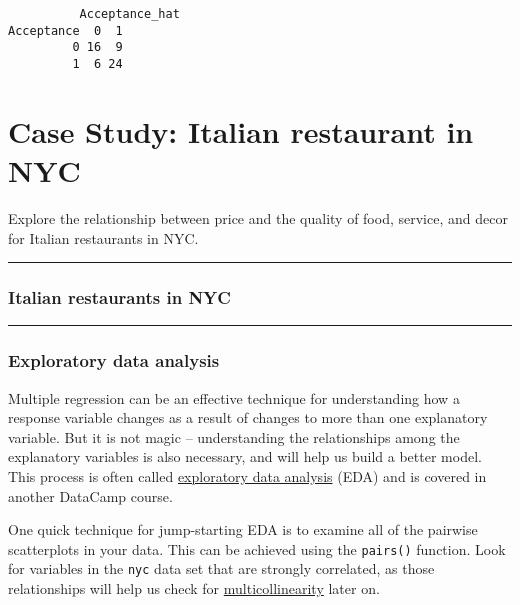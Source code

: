 \documentclass[
]{book}
\begin{document}
\begin{verbatim}
          Acceptance_hat
Acceptance  0  1
         0 16  9
         1  6 24
\end{verbatim}

\hypertarget{case-study-italian-restaurant-in-nyc}{%
\chapter{Case Study: Italian restaurant in NYC}\label{case-study-italian-restaurant-in-nyc}}

Explore the relationship between price and the quality of food, service, and decor for Italian restaurants in NYC.

\begin{center}\rule{0.5\linewidth}{0.5pt}\end{center}

\hypertarget{italian-restaurants-in-nyc}{%
\subsection*{Italian restaurants in NYC}\label{italian-restaurants-in-nyc}}

\begin{center}\rule{0.5\linewidth}{0.5pt}\end{center}

\hypertarget{exploratory-data-analysis}{%
\subsection*{Exploratory data analysis}\label{exploratory-data-analysis}}

Multiple regression can be an effective technique for understanding how a response variable changes as a result of changes to more than one explanatory variable. But it is not magic -- understanding the relationships among the explanatory variables is also necessary, and will help us build a better model. This process is often called \href{https://en.wikipedia.org/wiki/Exploratory_data_analysis}{exploratory data analysis} (EDA) and is covered in another DataCamp course.

One quick technique for jump-starting EDA is to examine all of the pairwise scatterplots in your data. This can be achieved using the \texttt{pairs()} function. Look for variables in the \texttt{nyc} data set that are strongly correlated, as those relationships will help us check for \href{https://en.wikipedia.org/wiki/Multicollinearity}{multicollinearity} later on.
\end{document}
